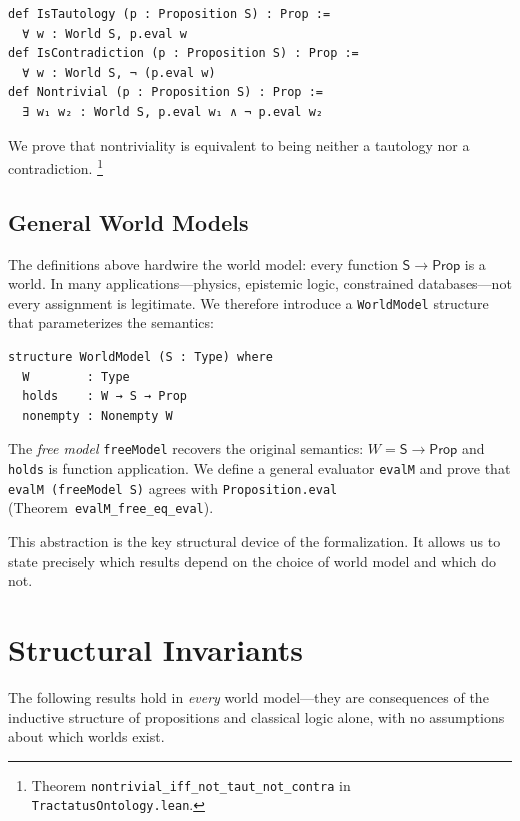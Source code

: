\documentclass[10pt, letterpaper]{article}
\theoremstyle{definition}
\theoremstyle{remark}
\newcommand{\Sach}{\mathsf{S}}
\newcommand{\Prop}{\mathsf{Prop}}
\begin{document}
\begin{lstlisting}
def IsTautology (p : Proposition S) : Prop :=
  ∀ w : World S, p.eval w
def IsContradiction (p : Proposition S) : Prop :=
  ∀ w : World S, ¬ (p.eval w)
def Nontrivial (p : Proposition S) : Prop :=
  ∃ w₁ w₂ : World S, p.eval w₁ ∧ ¬ p.eval w₂
\end{lstlisting}

\noindent
We prove that nontriviality is equivalent to being neither a
tautology nor a contradiction.%
\footnote{Theorem \texttt{nontrivial\_iff\_not\_taut\_not\_contra}
  in \texttt{TractatusOntology.lean}.}

\subsection{General World Models}
\label{sec:worldmodel}

The definitions above hardwire the world model: every
function $\Sach \to \Prop$ is a world.  In many
applications---physics, epistemic logic, constrained
databases---not every assignment is legitimate.
We therefore introduce a \texttt{WorldModel} structure
that parameterizes the semantics:

\begin{lstlisting}
structure WorldModel (S : Type) where
  W        : Type
  holds    : W → S → Prop
  nonempty : Nonempty W
\end{lstlisting}

\noindent
The \emph{free model} \texttt{freeModel} recovers the original
semantics: $W = \Sach \to \Prop$ and \texttt{holds} is function
application.  We define a general evaluator \texttt{evalM} and
prove that \texttt{evalM (freeModel S)} agrees with
\texttt{Proposition.eval} (Theorem~\texttt{evalM\_free\_eq\_eval}).

This abstraction is the key structural device of the
formalization.  It allows us to state precisely which results
depend on the choice of world model and which do not.

\section{Structural Invariants}
\label{sec:invariants}

The following results hold in \emph{every} world model---they
are consequences of the inductive structure of propositions and
classical logic alone, with no assumptions about which worlds
exist.
\end{document}
